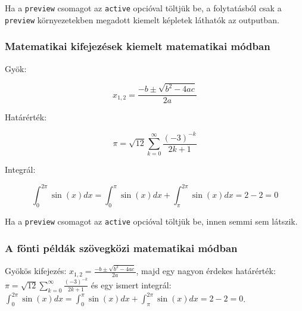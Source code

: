 \documentclass{article}
\begin{document}
 

Ha a \verb!preview! csomagot az \verb!active! opcióval töltjük be, a folytatásból csak a \verb!preview! környezetekben megadott kiemelt képletek láthatók az outputban.
\subsubsection*{Matematikai kifejezések  kiemelt matematikai módban}

Gyök:
\begin{preview}
	\[ x_{1,2} = \frac{-b\pm\sqrt{b^2-4ac}}{2a} \]
\end{preview}

Határérték:	
\begin{preview}	
\[ \pi = \sqrt{12}\sum^\infty_{k=0} \frac{ (-3)^{-k} }{ 2k+1 } \]
\end{preview}

Integrál:
\begin{preview}
\[\int_0^{2\pi} \sin(x)dx = \int_0^\pi \sin(x)dx +
\int_\pi^{2\pi} \sin(x)dx = 2 - 2 = 0 \]
\end{preview}

Ha a \verb!preview! csomagot az \verb!active! opcióval töltjük be, innen semmi sem látszik.
\subsubsection*{A fönti példák szövegközi matematikai módban}

Gyökös kifejezés: $ x_{1,2} = \frac{-b\pm\sqrt{b^2-4ac}}{2a} $, majd  egy
nagyon érdekes határérték: $ \pi=\sqrt{12}\sum^\infty_{k=0}\frac{(-3)^{-k}}{2k+1}$ és
egy ismert integrál:  $\int_0^{2\pi} \sin(x)dx = \int_0^\pi \sin(x)dx +
\int_\pi^{2\pi} \sin(x)dx = 2 - 2 = 0$.
\end{document}
